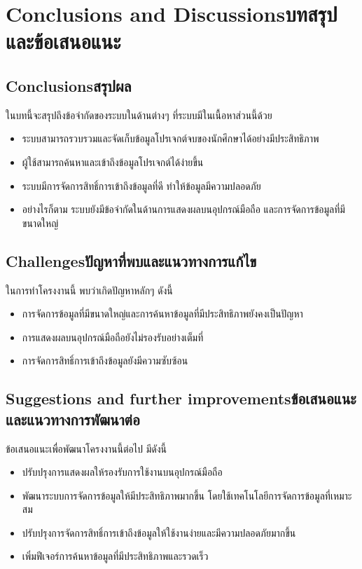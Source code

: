 \chapter{\ifenglish Conclusions and Discussions\else บทสรุปและข้อเสนอแนะ\fi}

\section{\ifenglish Conclusions\else สรุปผล\fi}

\hspace{1.27cm}ในบทนี้จะสรุปถึงข้อจำกัดของระบบในด้านต่างๆ ที่ระบบมีในเนื้อหาส่วนนี้ด้วย
\begin{itemize}
  \item ระบบสามารถรวบรวมและจัดเก็บข้อมูลโปรเจกต์จบของนักศึกษาได้อย่างมีประสิทธิภาพ
  \item ผู้ใช้สามารถค้นหาและเข้าถึงข้อมูลโปรเจกต์ได้ง่ายขึ้น
  \item ระบบมีการจัดการสิทธิ์การเข้าถึงข้อมูลที่ดี ทำให้ข้อมูลมีความปลอดภัย
  \item อย่างไรก็ตาม ระบบยังมีข้อจำกัดในด้านการแสดงผลบนอุปกรณ์มือถือ และการจัดการข้อมูลที่มีขนาดใหญ่
\end{itemize}

\section{\ifenglish Challenges\else ปัญหาที่พบและแนวทางการแก้ไข\fi}

\hspace{1.27cm}ในการทำโครงงานนี้ พบว่าเกิดปัญหาหลักๆ ดังนี้
\begin{itemize}
  \item การจัดการข้อมูลที่มีขนาดใหญ่และการค้นหาข้อมูลที่มีประสิทธิภาพยังคงเป็นปัญหา
  \item การแสดงผลบนอุปกรณ์มือถือยังไม่รองรับอย่างเต็มที่
  \item การจัดการสิทธิ์การเข้าถึงข้อมูลยังมีความซับซ้อน
\end{itemize}

\section{\ifenglish Suggestions and further improvements\else ข้อเสนอแนะและแนวทางการพัฒนาต่อ\fi}

\hspace{1.27cm}ข้อเสนอแนะเพื่อพัฒนาโครงงานนี้ต่อไป มีดังนี้
\begin{itemize}
  \item ปรับปรุงการแสดงผลให้รองรับการใช้งานบนอุปกรณ์มือถือ
  \item พัฒนาระบบการจัดการข้อมูลให้มีประสิทธิภาพมากขึ้น โดยใช้เทคโนโลยีการจัดการข้อมูลที่เหมาะสม
  \item ปรับปรุงการจัดการสิทธิ์การเข้าถึงข้อมูลให้ใช้งานง่ายและมีความปลอดภัยมากขึ้น
  \item เพิ่มฟีเจอร์การค้นหาข้อมูลที่มีประสิทธิภาพและรวดเร็ว
\end{itemize}